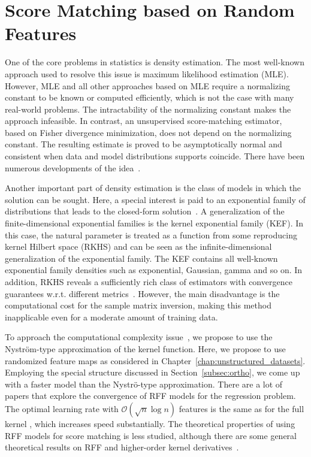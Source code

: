 \section{Score Matching based on Random Features}
\label{sec:score_matching}

One of the core problems in statistics is density estimation.
The most well-known approach used to resolve this issue is maximum likelihood estimation (MLE).
However, MLE and all other approaches based on MLE require a normalizing constant to be known
or computed efficiently, which is not the case with many real-world problems.
The intractability of the normalizing constant makes the approach infeasible.
In contrast, an unsupervised score-matching estimator,~\cite{Hyvarinen2005} based on Fisher divergence minimization, does not depend on the normalizing constant.
The resulting estimate is proved to be asymptotically normal and consistent when
data and model distributions supports coincide.
There have been numerous developments of the
 idea~\cite{hyvarinen2007some, Lyu2012, Gutmann2012bregman, Kanti2016, dai2018kernel}.

Another important part of density estimation is the class of models in which the solution can be sought.
Here, a special interest is paid to an exponential family of distributions that leads to the
closed-form solution~\cite{hyvarinen2007some, forbes2015linear, Lin2016, Shiqing2018, monti2018}.
A generalization of the finite-dimensional exponential families is the kernel exponential family
(KEF).
In this case, the natural parameter is treated as a function from some
reproducing kernel Hilbert space (RKHS)
and can be seen as the infinite-dimensional generalization of the exponential family.
The KEF contains all well-known exponential family densities such as exponential, Gaussian,
gamma and so on.
In addition, RKHS reveals a sufficiently rich class of
estimators with convergence guarantees w.r.t. different
metrics~\cite{Gretton2013, Gretton2015}.
However, the main disadvantage is the computational cost for the sample matrix inversion, making this
method inapplicable even for a moderate amount of training data.

To approach the computational complexity issue~\cite{sutherland2017efficient, GrettonDeep}, we propose to use the Nystr{\"o}m-type approximation of the kernel function.
Here, we propose to use randomized feature maps as considered in
Chapter~\ref{chap:unstructured_datasets}.
Employing the special structure discussed in Section~\ref{subsec:ortho},
we come up with a faster model than the Nystr{\"o}-type approximation.
There are a lot of papers that explore the convergence of RFF models for the regression problem.
The optimal learning rate with $\mathcal{O}(\sqrt{n}\log n)$ features is the same as for the
full kernel \cite{aless2016generalization},
which increases speed substantially.
The theoretical properties of using RFF models for score matching is less studied,
although there are some general theoretical results on RFF and
higher-order kernel derivatives~\cite{Orlicz,OperatorValuedKernels}.

